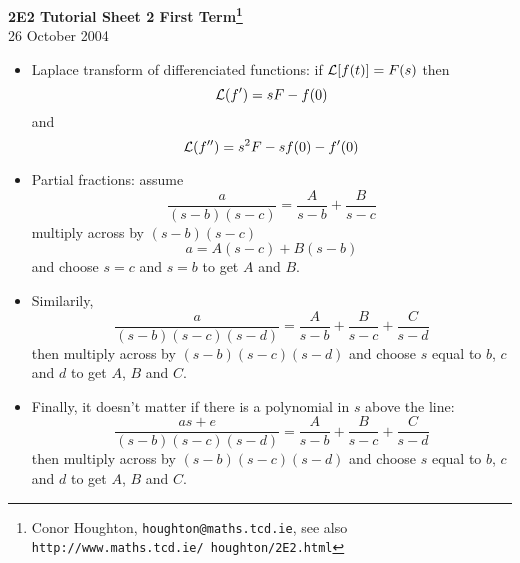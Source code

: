\documentclass[12pt]{article}
\begin{document}
\begin{center}
\textsf{
{\bf 2E2 Tutorial Sheet 2 First Term\footnote{Conor Houghton, {\tt houghton@maths.tcd.ie}, see also {\tt http://www.maths.tcd.ie/ houghton/2E2.html}}}\\[1cm] 26 October 2004}
\end{center}


\renewcommand{\labelenumi}{\arabic{enumi}.}
\begin{itemize}
\item Laplace transform of differenciated functions: if ${\cal L}[f(t)]=F(s)$ then
\begin{equation}
{\cal L}(f')=sF-f(0)
\end{equation}
and
\begin{equation}
{\cal L}(f'')=s^2F-sf(0)-f'(0)
\end{equation}                                

\item Partial fractions: assume
\begin{equation}
\frac{a}{(s-b)(s-c)}=\frac{A}{s-b}+\frac{B}{s-c}
\end{equation}
multiply across by $(s-b)(s-c)$
\begin{equation}
a=A(s-c)+B(s-b)
\end{equation}
and choose $s=c$ and $s=b$ to get $A$ and $B$. 

\item Similarily, 
\begin{equation}
\frac{a}{(s-b)(s-c)(s-d)}=\frac{A}{s-b}+\frac{B}{s-c}+\frac{C}{s-d}
\end{equation}
then multiply across by $(s-b)(s-c)(s-d)$ and choose $s$ equal to $b$, $c$ and $d$ to get $A$, $B$ and $C$.

\item Finally, it doesn't matter if there is a polynomial in $s$ above the line:\begin{equation}
\frac{as+e}{(s-b)(s-c)(s-d)}=\frac{A}{s-b}+\frac{B}{s-c}+\frac{C}{s-d}
\end{equation}
then multiply across by $(s-b)(s-c)(s-d)$ and choose $s$ equal to $b$, $c$ and $d$ to get $A$, $B$ and $C$.


\end{itemize}

\newpage

\end{document}
